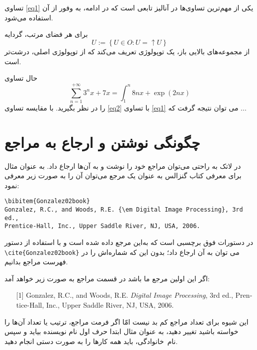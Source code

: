تساوی \eqref{eq1} یکی از مهم‌‌ترین تساوی‌ها در آنالیز تابعی است که در ادامه، به وفور از آن استفاده می‌شود.

\begin{example}
برای هر فضای مرتب، گردایه 
$$U:=\left\lbrace U\in O: U=\uparrow U\right\rbrace $$
از مجموعه‌های بالایی باز، یک توپولوژی تعریف می‌کند که از توپولوژی اصلی، درشت‌تر  است.
\end{example}
حال تساوی 
\begin{equation}\label{eq2}
\sum_{n=1}^{+\infty} 3^{n}x+7x=\int_{1}^{n}8nx+\exp{(2nx)}
\end{equation}
را در نظر بگیرید. با مقایسه تساوی \eqref{eq2} با تساوی \eqref{eq1} می توان نتیجه گرفت که ...


\section{چگونگی نوشتن و ارجاع به مراجع}\label{Sec:Ref}

در لاتک به راحتی می‌توان مراجع خود را نوشت و به آن‌ها ارجاع داد. به عنوان مثال برای معرفی کتاب گنزالس \cite{Gonzalez02book} به عنوان یک مرجع 
می‌توان آن را به صورت زیر معرفی نمود:
\begin{latin}
\begin{Verbatim}
\bibitem{Gonzalez02book}
Gonzalez, R.C., and Woods, R.E. {\em Digital Image Processing}, 3rd ed.,
Prentice-Hall, Inc., Upper Saddle River, NJ, USA, 2006.
\end{Verbatim}
\end{latin}

در دستورات فوق   برچسبی است که به‌این مرجع داده شده است و با استفاده از دستور \Verb!\cite{Gonzalez02book}!
می توان به آن ارجاع داد؛ بدون این که شماره‌اش را در فهرست مراجع بدانیم.

اگر این اولین مرجع ما باشد در قسمت مراجع به صورت زیر خواهد آمد:\\
\begin{latin}
\begin{enumerate}
    \item [{[1]}] Gonzalez, R.C., and Woods, R.E. {\em Digital Image Processing}, 3rd ed.,
    Prentice-Hall, Inc., Upper Saddle River, NJ, USA, 2006.
\end{enumerate}
\end{latin}

این شیوه برای تعداد مراجع کم بد نیست امّا اگر فرمت مراجع، ترتیب یا تعداد آن‌ها را خواسته باشید تغییر دهید، به عنوان مثال ابتدا حرف اول نام نویسنده بیاید 
و سپس نام~خانوادگی، باید همه کارها را به صورت دستی انجام دهید.

